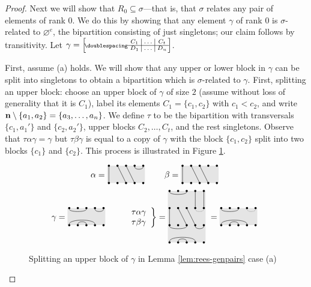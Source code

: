 \begin{lemma}
\begin{proof}
    Next we will show that $R_0 \subseteq \sigma$---that is, that $\sigma$
    relates any pair of elements of rank $0$.  We do this by showing that any
    element $\gamma$ of rank $0$ is $\sigma$-related to $\varnothing^e$, the
    bipartition consisting of just singletons; our claim follows by
    transitivity.  Let
    $\gamma = \bipart{c|c|c}{1-3}{C_1 & \ldots & C_t}{D_1 & \ldots & D_u}$.

    First, assume (a) holds.  We will show that any upper or lower block in
    $\gamma$ can be split into singletons to obtain a bipartition which is
    $\sigma$-related to $\gamma$.  First, splitting an upper block: choose an
    upper block of $\gamma$ of size $2$ (assume without loss of generality that
    it is $C_1$), label its elements $C_1 = \{c_1, c_2\}$ with $c_1 < c_2$, and
    write $\mathbf{n} \setminus \{a_1, a_2\} = \{a_3, \ldots, a_n\}$.  We define
    $\tau$ to be the bipartition with transversals $\{c_1, a_1'\}$ and
    $\{c_2, a_2'\}$, upper blocks $C_2, \ldots, C_t$, and the rest singletons.
    Observe that $\tau\alpha\gamma = \gamma$ but $\tau\beta\gamma$ is equal
    to a copy of $\gamma$ with the block $\{c_1, c_2\}$ split into two blocks
    $\{c_1\}$ and $\{c_2\}$.  This process is illustrated in Figure
    \ref{fig:case-a-r0-example-upper}.

    \begin{figure}[h]
      \centering
      $$
      \alpha = \bipartdiag{\tv11 \tv23 \tv34 \tc45} \qquad
      \beta = \bipartdiag{\tv11 \tv23 \tv34}
      $$
      $$
      \gamma = \bipartdiag{\tc13 \tc45 \bC14 \bc23} \qquad
      \left.
        \begin{array}{l}\tau\alpha\gamma\\ \tau\beta\gamma \end{array}
      \right\} = \triplebipartdiag{
        \uutc13 \uutv44 \uutv55
        \utv11 \utv23 \utv34
        \draw[densely dotted](5, 3.875) .. controls (5, 3.5) and (4, 3.5) .. (4, 3.875);
        \tc13 \tc45 \bC14 \bc23
      } = \bipartdiag{\tc13 \bC14 \bc23
        \draw[densely dotted](4, 1.875) .. controls (4, 1.5) and (5, 1.5) .. (5, 1.875);
      }
      $$
      \caption{Splitting an upper block of $\gamma$ in Lemma
        \ref{lem:rees-genpairs} case (a)}
      \label{fig:case-a-r0-example-upper}
    \end{figure}


\end{proof}
\end{lemma}

